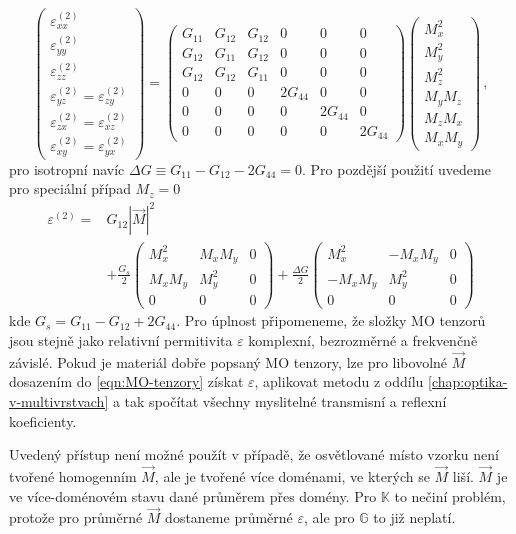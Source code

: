 \begin{equation}
    \begin{pmatrix}
        \varepsilon^{(2)}_{xx} \\ \varepsilon^{(2)}_{yy} \\ \varepsilon^{(2)}_{zz} 
        \\ \varepsilon^{(2)}_{yz}=\varepsilon^{(2)}_{zy} 
        \\ \varepsilon^{(2)}_{zx}=\varepsilon^{(2)}_{xz} 
        \\ \varepsilon^{(2)}_{xy}=\varepsilon^{(2)}_{yx}
    \end{pmatrix}
    =\begin{pmatrix}
        G_{11} & G_{12} & G_{12} & 0 & 0 & 0 \\
        G_{12} & G_{11} & G_{12} & 0 & 0 & 0 \\
        G_{12} & G_{12} & G_{11} & 0 & 0 & 0 \\
        0 & 0 & 0 & 2G_{44} & 0 & 0 \\
        0 & 0 & 0 & 0 & 2G_{44} & 0 \\
        0 & 0 & 0 & 0 & 0 & 2G_{44}
    \end{pmatrix}
    \begin{pmatrix} M_x^2 \\ M_y^2 \\ M_z^2 \\ M_y M_z \\ M_z M_x \\ M_x M_y \end{pmatrix} \,,
\end{equation}
pro isotropní navíc $\Delta G \equiv G_{11}-G_{12}-2G_{44}=0$.
Pro pozdější použití uvedeme pro speciální případ $M_z=0$
\begin{align}
    \varepsilon^{(2)} =& G_{12} |\vec{M}|^2 \\ 
    &+ \frac{G_s}{2} \begin{pmatrix}
        M_x^2 & M_x M_y & 0 \\ M_x M_y & M_y^2 & 0 \\ 0 & 0 & 0
    \end{pmatrix}
    + \frac{\Delta G}{2} \begin{pmatrix}
        M_x^2 & -M_xM_y & 0 \\ -M_xM_y & M_y^2 & 0 \\ 0 & 0 & 0
    \end{pmatrix}
\end{align}
kde $G_s=G_{11}-G_{12}+2G_{44}$.
Pro úplnost připomeneme, že složky MO tenzorů jsou stejně jako relativní permitivita $\varepsilon$ komplexní, bezrozměrné a frekvenčně závislé.
Pokud je materiál dobře popsaný MO tenzory, lze pro libovolné $\vec{M}$ dosazením do \eqref{eqn:MO-tenzory} získat $\varepsilon$, aplikovat metodu z oddílu \ref{chap:optika-v-multivrstvach} a tak spočítat všechny myslitelné transmisní a reflexní koeficienty.

Uvedený přístup není možné použít v případě, že osvětlované místo vzorku není tvořené homogenním $\vec{M}$, ale je tvořené více doménami, ve kterých se $\vec{M}$ liší.
$\vec{M}$ je ve více-doménovém stavu dané průměrem přes domény.
Pro $\mathbb{K}$ to nečiní problém, protože pro průměrné $\vec{M}$ dostaneme průměrné $\varepsilon$, ale pro $\mathbb{G}$ to již neplatí.
